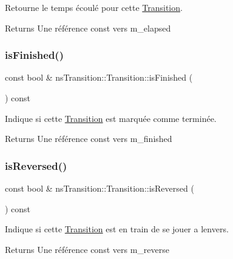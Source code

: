 Retourne le temps écoulé pour cette \hyperlink{classns_transition_1_1_transition}{Transition}. 

\begin{DoxyReturn}{Returns}
Une référence const vers m\+\_\+elapsed 
\end{DoxyReturn}
\mbox{\label{classns_transition_1_1_transition_ad9d358bee54825d2a8bf83e9e21e398b}} 
\subsubsection{\texorpdfstring{is\+Finished()}{isFinished()}}
{\footnotesize\ttfamily const bool \& ns\+Transition\+::\+Transition\+::is\+Finished (\begin{DoxyParamCaption}{ }\end{DoxyParamCaption}) const}



Indique si cette \hyperlink{classns_transition_1_1_transition}{Transition} est marquée comme terminée. 

\begin{DoxyReturn}{Returns}
Une référence const vers m\+\_\+finished 
\end{DoxyReturn}
\mbox{\label{classns_transition_1_1_transition_ab32ef25219cd2227746444ac8794266a}} 
\subsubsection{\texorpdfstring{is\+Reversed()}{isReversed()}}
{\footnotesize\ttfamily const bool \& ns\+Transition\+::\+Transition\+::is\+Reversed (\begin{DoxyParamCaption}{ }\end{DoxyParamCaption}) const}



Indique si cette \hyperlink{classns_transition_1_1_transition}{Transition} est en train de se jouer a l\textquotesingle{}envers. 

\begin{DoxyReturn}{Returns}
Une référence const vers m\+\_\+reverse 
\end{DoxyReturn}
\mbox{\label{classns_transition_1_1_transition_a0a8e848a50c2e05dc72800abfc6dd6ef}} 
